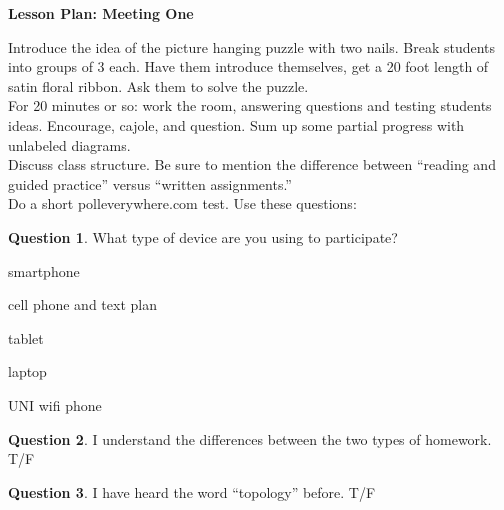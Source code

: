\documentclass[12pt]{amsart}
\theoremstyle{definition}
\newtheorem{question}{Question}
\begin{document}
\begin{center}
\textbf{\Huge
Lesson Plan: Meeting One
}
\end{center}
\vspace{.5in}

Introduce the idea of the picture hanging puzzle with two nails. 
Break students into groups of 3 each. 
Have them introduce themselves, get a 20 foot length of satin floral ribbon. 
Ask them to solve the puzzle.\\


For 20 minutes or so: work the room, answering questions and testing students ideas.
Encourage, cajole, and question.
Sum up some partial progress with unlabeled diagrams. \\

Discuss class structure. Be sure to mention the difference between ``reading and guided practice'' versus ``written assignments.''\\

Do a short polleverywhere.com test.
Use these questions:
\begin{question}
What type of device are you using to participate?
\begin{compactitem}
\item smartphone
\item cell phone and text plan
\item tablet
\item laptop
\item UNI wifi phone
\end{compactitem}
\end{question}

\begin{question}
I understand the differences between the two types of homework. T/F
\end{question}

\begin{question}
I have heard the word ``topology'' before. T/F
\end{question}
\end{document}
